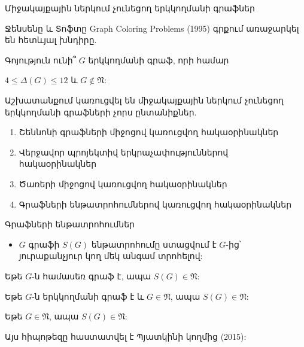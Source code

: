 \begin{frame}[shrink]{Միջակայքային ներկում չունեցող երկկողմանի գրաֆներ}

Ջենսենը և Տոֆտը Graph Coloring Problems (1995) գրքում առաջարկել են հետևյալ խնդիրը.
\begin{problem}
Գոյություն ունի՞ $G$ երկկողմանի գրաֆ, որի համար 
\begin{center}
$4\leq \Delta(G)\leq 12$ և
$G\notin \mathfrak{N}$:
\end{center}
\end{problem}

\pause

Աշխատանքում կառուցվել են միջակայքային ներկում չունեցող երկկողմանի գրաֆների չորս ընտանիքներ.
\begin{enumerate}
    \item Շեննոնի գրաֆների միջոցով կառուցվող հակաօրինակներ
    \item Վերջավոր պրոյեկտիվ երկրաչափություններով հակաօրինակներ
    \item Ծառերի միջոցով կառուցվող հակաօրինակներ
    \item Գրաֆների ենթատրոհումներով կառուցվող հակաօրինակներ
\end{enumerate}
\end{frame}

\begin{frame}{Գրաֆների ենթատրոհումներ}
\begin{itemize}
\item $G$ գրաֆի $S(G)$ ենթատրոհումը ստացվում է $G$-ից՝ յուրաքանչյուր կող մեկ անգամ տրոհելով:
\end{itemize}

\begin{theorem}
Եթե $G$-ն համասեռ գրաֆ է, ապա $S(G)\in \mathfrak{N}$: 
\end{theorem}
\begin{remark}[3.3.13]
Եթե $G$-ն երկկողմանի գրաֆ է և $G \in \mathfrak{N}$, ապա $S(G)\in \mathfrak{N}$: 
\end{remark}
\pause
\begin{hypothesis}
Եթե $G\in \mathfrak{N}$, ապա $S(G)\in \mathfrak{N}$:
\end{hypothesis}

Այս հիպոթեզը հաստատվել է Պյատկինի կողմից (2015):
\end{frame}

